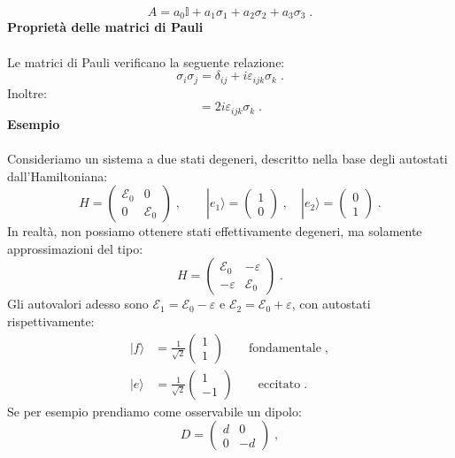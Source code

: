 \documentclass[12pt,a4paper]{report}
\theoremstyle{definition}
\numberwithin{equation}{section}
\newcommand{\ket}{\rangle}
\begin{document}
$$
A=a_0 \mathbb{I}+a_1 \sigma_1+a_2\sigma_2+a_3 \sigma_3\;.
$$
\textbf{Proprietà delle matrici di Pauli} \\
\\
Le matrici di Pauli verificano la seguente relazione:
\begin{equation}
\sigma_i\sigma_j=\delta_{ij}+i\varepsilon_{ijk}\sigma_k\;.
\end{equation}
Inoltre:
\begin{equation}
[\sigma_i,\sigma_j]=2i\varepsilon_{ijk}\sigma_k\;.
\end{equation}
\textbf{Esempio} \\
\\
Consideriamo un sistema a due stati degeneri, descritto nella base degli autostati dall'Hamiltoniana:
$$
H=\left(
\begin{matrix}
\mathcal{E}_0 & 0 \\
0 & \mathcal{E}_0
\end{matrix}\right)\;, \qquad |e_1\ket=\left(
\begin{matrix}
1 \\
0
\end{matrix}\right)\;,\quad |e_2\ket=\left(
\begin{matrix}
0 \\
1
\end{matrix}\right)\;.
$$
In realtà, non possiamo ottenere stati effettivamente degeneri, ma solamente approssimazioni del tipo:
$$
H=\left(
\begin{matrix}
\mathcal{E}_0 & -\varepsilon \\
-\varepsilon & \mathcal{E}_0
\end{matrix}\right)\;.
$$
Gli autovalori adesso sono $\mathcal{E}_1=\mathcal{E}_0-\varepsilon$ e $\mathcal{E}_2=\mathcal{E}_0+\varepsilon$, con autostati rispettivamente:
\begin{align*}
|f\ket&=\frac{1}{\sqrt{2}}\left(
\begin{matrix}
1 \\
1
\end{matrix}\right) \qquad \mbox{fondamentale}\;, \\
|e\ket&=\frac{1}{\sqrt{2}}\left(
\begin{matrix}
1 \\
-1
\end{matrix}\right) \qquad \mbox{eccitato}\;.
\end{align*}
Se per esempio prendiamo come osservabile un dipolo:
$$
D=\left(
\begin{matrix}
d & 0 \\
0 & -d
\end{matrix}\right)\;,
$$
\end{document}
